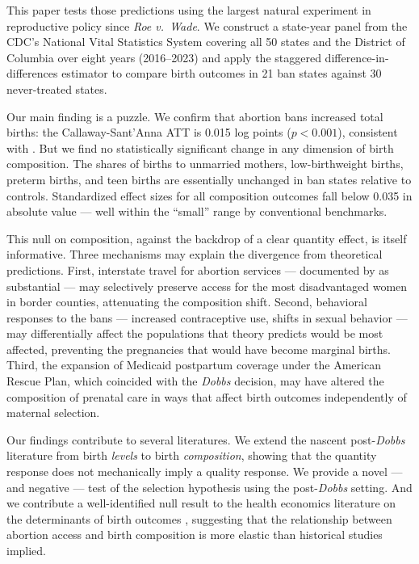 \documentclass[12pt]{article}
\begin{document}
This paper tests those predictions using the largest natural experiment in reproductive policy since \emph{Roe v.\ Wade}. We construct a state-year panel from the CDC's National Vital Statistics System covering all 50 states and the District of Columbia over eight years (2016--2023) and apply the \citet{callaway2021difference} staggered difference-in-differences estimator to compare birth outcomes in 21 ban states against 30 never-treated states.

Our main finding is a puzzle. We confirm that abortion bans increased total births: the Callaway-Sant'Anna ATT is 0.015 log points ($p < 0.001$), consistent with \citet{myers2024effects}. But we find no statistically significant change in any dimension of birth composition. The shares of births to unmarried mothers, low-birthweight births, preterm births, and teen births are essentially unchanged in ban states relative to controls. Standardized effect sizes for all composition outcomes fall below 0.035 in absolute value --- well within the ``small'' range by conventional benchmarks.

This null on composition, against the backdrop of a clear quantity effect, is itself informative. Three mechanisms may explain the divergence from theoretical predictions. First, interstate travel for abortion services --- documented by \citet{myers2024effects} as substantial --- may selectively preserve access for the most disadvantaged women in border counties, attenuating the composition shift. Second, behavioral responses to the bans --- increased contraceptive use, shifts in sexual behavior --- may differentially affect the populations that theory predicts would be most affected, preventing the pregnancies that would have become marginal births. Third, the expansion of Medicaid postpartum coverage under the American Rescue Plan, which coincided with the \emph{Dobbs} decision, may have altered the composition of prenatal care in ways that affect birth outcomes independently of maternal selection.

Our findings contribute to several literatures. We extend the nascent post-\emph{Dobbs} literature \citep{myers2024effects, bitler2023effect, dave2023impact} from birth \emph{levels} to birth \emph{composition}, showing that the quantity response does not mechanically imply a quality response. We provide a novel --- and negative --- test of the \citet{akerlof1996analysis} selection hypothesis using the post-\emph{Dobbs} setting. And we contribute a well-identified null result to the health economics literature on the determinants of birth outcomes \citep{currie2010inequality, almond2005costs}, suggesting that the relationship between abortion access and birth composition is more elastic than historical studies implied.
\end{document}
